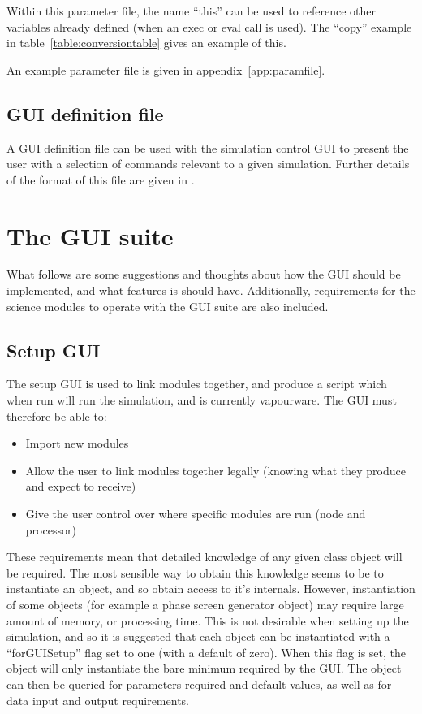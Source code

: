 \documentclass{article}
\begin{document}
Within this parameter file, the name ``this'' can be
used to reference other variables already defined (when an exec or
eval call is used).  The ``copy'' example in
table~\ref{table:conversiontable} gives an example of this.

An example parameter file is given in appendix~\ref{app:paramfile}.

\subsection{GUI definition file}
A GUI definition file can be used with the simulation control GUI to
present the user with a selection of commands relevant to a given
simulation.  Further details of the format of this file are given in
\citet{simctrlgui}.  

\section{The GUI suite}
What follows are some suggestions and thoughts about how the GUI
should be implemented, and what features is should have.
Additionally, requirements for the science modules to operate with the
GUI suite are also included.

\subsection{Setup GUI}
The setup GUI is used to link modules together, and produce a script
which when run will run the simulation, and is currently vapourware.
The GUI must therefore be able to:

\begin{itemize}
\item Import new modules
\item Allow the user to link modules together legally (knowing what they
produce and expect to receive)
\item Give the user control over where specific modules are run (node
  and processor)
\end{itemize}

These requirements mean that detailed knowledge of any given class
object will be required.  The most sensible way to obtain this
knowledge seems to be to instantiate an object, and so obtain access
to it's internals.  However, instantiation of some objects (for
example a phase screen generator object) may require large amount of
memory, or processing time.  This is not desirable when setting up the
simulation, and so it is suggested that each object can be
instantiated with a ``forGUISetup'' flag set to one
(with a default of zero).  When this flag is set, the object will only
instantiate the bare minimum required by the GUI.  The object can then
be queried for parameters required and default values, as well as for
data input and output requirements.
\end{document}
